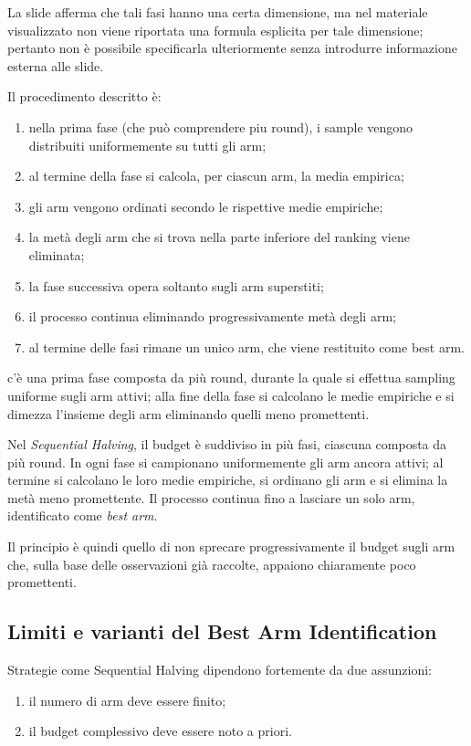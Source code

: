 La slide afferma che tali fasi hanno una certa dimensione, ma nel materiale visualizzato non viene riportata una formula esplicita per tale dimensione; pertanto non è possibile specificarla ulteriormente senza introdurre informazione esterna alle slide.

Il procedimento descritto è:
\begin{enumerate}
    \item nella prima fase (che può comprendere piu round), i sample vengono distribuiti uniformemente su tutti gli arm;
    \item al termine della fase si calcola, per ciascun arm, la media empirica;
    \item gli arm vengono ordinati secondo le rispettive medie empiriche;
    \item la metà degli arm che si trova nella parte inferiore del ranking viene eliminata;
    \item la fase successiva opera soltanto sugli arm superstiti;
    \item il processo continua eliminando progressivamente metà degli arm;
    \item al termine delle fasi rimane un unico arm, che viene restituito come best arm.
\end{enumerate}
c'è una prima fase composta da più round, durante la quale si effettua sampling uniforme sugli arm attivi; alla fine della fase si calcolano le medie empiriche e si dimezza l'insieme degli arm eliminando quelli meno promettenti.
\begin{center}
Nel \emph{Sequential Halving}, il budget è suddiviso in più fasi, ciascuna composta da più round. In ogni fase si campionano uniformemente gli arm ancora attivi; al termine si calcolano le loro medie empiriche, si ordinano gli arm e si elimina la metà meno promettente. Il processo continua fino a lasciare un solo arm, identificato come \emph{best arm}.
\end{center}
Il principio è quindi quello di non sprecare progressivamente il budget sugli arm che, sulla base delle osservazioni già raccolte, appaiono chiaramente poco promettenti.

\subsection{Limiti e varianti del Best Arm Identification}

Strategie come Sequential Halving dipendono fortemente da due assunzioni:
\begin{enumerate}
    \item il numero di arm deve essere finito;
    \item il budget complessivo deve essere noto a priori.
\end{enumerate}

